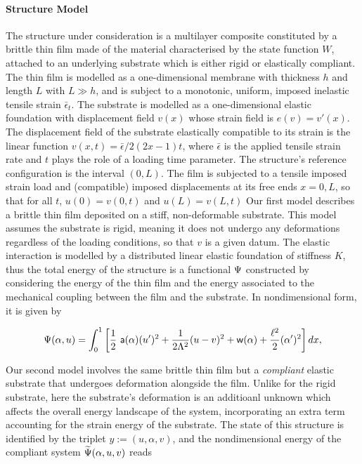 \paragraph{Structure Model}
The structure under consideration is a multilayer composite constituted by a brittle thin film  made of the material characterised by the state function $W$, attached to an underlying substrate which is either rigid or elastically compliant. The thin film is modelled as a one-dimensional membrane with thickness $h$ and length $L$ with $L\gg h$, and is subject to a monotonic, uniform, imposed inelastic tensile strain $\bar\epsilon_t$. 
% 
The substrate is modelled as a one-dimensional elastic foundation with displacement field $v(x)$ whose strain field is $e(v) = v'(x)$. 
% 
The displacement field of the substrate elastically compatible to its strain is the linear function $v(x, t) = \bar\epsilon/2 (2x-1) t$, where $\bar\epsilon$ is the applied tensile strain rate and $t$ plays the role of a loading time parameter. 
% 
The structure's reference configuration is the interval $(0, L)$. The film is subjected to a tensile imposed strain load and (compatible) imposed displacements at its free ends $x = 0, L$, so that for all $t$, $u(0)=v(0, t)$ and $u(L)=v(L, t)$
% 
Our first model describes a brittle thin film deposited on a stiff, non-deformable substrate. This model assumes the substrate is rigid, meaning it does not undergo any deformations regardless of the loading conditions, so that $v$ is a given datum. The elastic interaction is modelled by a distributed linear elastic foundation of stiffness $K$, thus
the total energy of the structure is a functional $\Psi$ constructed by considering the energy of the thin film and the energy associated to the mechanical coupling between the film and the substrate. In nondimensional form, it is given by

\begin{equation}
    \label{def:energy_stiff}
    \Psi(\alpha, u) = \int_{0}^{1} \left[ \frac{1}{2} \ \soften(\alpha)(u')^2 
    + \frac{1}{2 \elastell^2} (u-\subsu)^2
    + \homogdiss(\alpha) + \frac{\damagell^2}{2}(\alpha')^2 
     \right] dx,
\end{equation}

Our second model involves the same brittle thin film but a \emph{compliant} elastic substrate that undergoes deformation alongside the film. Unlike for the rigid substrate, here the substrate's deformation is an additioanl unknown which affects the overall energy landscape of the system, incorporating an extra term accounting for the strain energy of the substrate. 
The state of this structure is identified by the triplet $y:=(u, \alpha, v)$, and the nondimensional energy of the compliant system  $\widetilde\Psi(\alpha, u, v)$ reads

